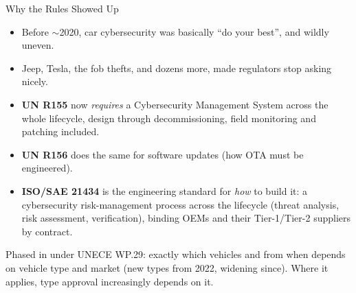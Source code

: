 
\begin{frame}{Why the Rules Showed Up}
  \begin{itemize}
    \item Before $\sim$2020, car cybersecurity was basically ``do your best'', and wildly uneven.
    \item Jeep, Tesla, the fob thefts, and dozens more, made regulators stop asking nicely.
    \item \textbf{UN R155} now \emph{requires} a Cybersecurity Management System across the whole lifecycle, design through decommissioning, field monitoring and patching included.
    \item \textbf{UN R156} does the same for software updates (how OTA must be engineered).
    \item \textbf{ISO/SAE 21434} is the engineering standard for \emph{how} to build it: a cybersecurity risk-management process across the lifecycle (threat analysis, risk assessment, verification), binding OEMs and their Tier-1/Tier-2 suppliers by contract.
  \end{itemize}
  \vspace{1mm}
  {\footnotesize Phased in under UNECE WP.29: exactly which vehicles and from when depends on vehicle type and market (new types from 2022, widening since). Where it applies, type approval increasingly depends on it.}
\end{frame}

